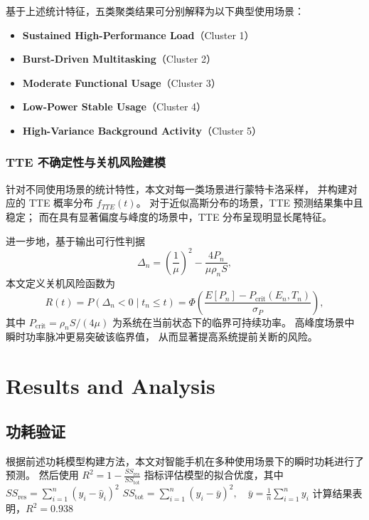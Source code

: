 \documentclass[11pt]{article}
\begin{document}
基于上述统计特征，五类聚类结果可分别解释为以下典型使用场景：
\begin{itemize}
    \item \textbf{Sustained High-Performance Load}（Cluster 1）
    \item \textbf{Burst-Driven Multitasking}（Cluster 2）
    \item \textbf{Moderate Functional Usage}（Cluster 3）
    \item \textbf{Low-Power Stable Usage}（Cluster 4）
    \item \textbf{High-Variance Background Activity}（Cluster 5）
\end{itemize}

\subsubsection{TTE 不确定性与关机风险建模}

针对不同使用场景的统计特性，本文对每一类场景进行蒙特卡洛采样，
并构建对应的 TTE 概率分布 $f_{TTE}(t)$。
对于近似高斯分布的场景，TTE 预测结果集中且稳定；
而在具有显著偏度与峰度的场景中，TTE 分布呈现明显长尾特征。

进一步地，基于输出可行性判据
\[
\Delta_n = \left( \frac{1}{\mu} \right)^2 - \frac{4P_n}{\mu\rho_n S},
\]
本文定义关机风险函数为
\[
R(t) = P(\Delta_n < 0 \mid t_n \le t)
= \Phi\!\left(
\frac{E[P_n] - P_{\mathrm{crit}}(E_n,T_n)}{\sigma_P}
\right),
\]
其中 $P_{\mathrm{crit}}=\rho_n S/(4\mu)$ 为系统在当前状态下的临界可持续功率。
高峰度场景中瞬时功率脉冲更易突破该临界值，
从而显著提高系统提前关断的风险。










\section{Results and Analysis}


\subsection{功耗验证}
根据前述功耗模型构建方法，本文对智能手机在多种使用场景下的瞬时功耗进行了预测。
然后使用
$R^2 = 1 - \frac{SS_{\text{res}}}{SS_{\text{tot}}}$
指标评估模型的拟合优度，其中
$SS_{\text{res}}=\sum_{i=1}^n (y_i-\hat y_i)^2$
$SS_{\text{tot}}=\sum_{i=1}^n (y_i-\bar y)^2,\quad \bar y=\frac{1}{n}\sum_{i=1}^n y_i$
计算结果表明，$R^2=0.938$
\end{document}
